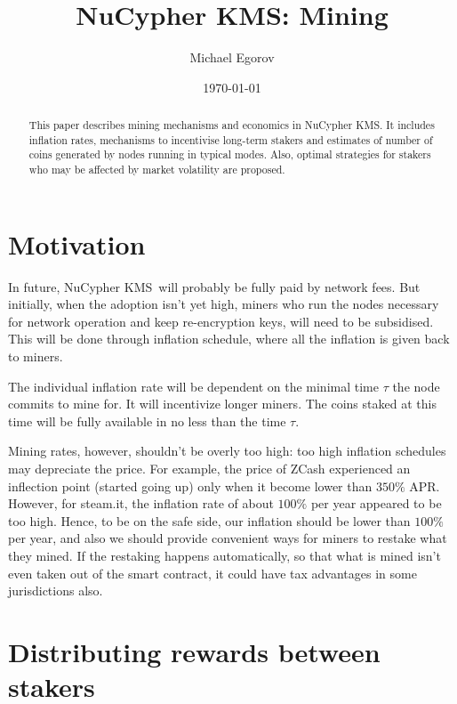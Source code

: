 \documentclass[longbibliography,nofootinbib,twocolumn]{revtex4-1}
\newcommand{\kms}{NuCypher KMS}
\begin{document}
\title{\kms: Mining}

\author{Michael Egorov}

\begin{abstract}
    This paper describes mining mechanisms and economics in \kms.
    It includes inflation rates, mechanisms to incentivise long-term stakers
    and estimates of number of coins generated by nodes running in typical modes.
    Also, optimal strategies for stakers who may be affected by market volatility are proposed.
\end{abstract}

\date{\today}
\maketitle

\section{Motivation}

In future, \kms~will probably be fully paid by network fees.
But initially, when the adoption isn't yet high, miners who run the nodes necessary for network operation and keep re-encryption keys,
will need to be subsidised.
This will be done through inflation schedule, where all the inflation is given back to miners.

The individual inflation rate will be dependent on the minimal time $\tau$ the node commits to mine for.
It will incentivize longer miners.
The coins staked at this time will be fully available in no less than the time $\tau$.

Mining rates, however, shouldn't be overly too high: too high inflation schedules may depreciate the price.
For example, the price of ZCash experienced an inflection point (started going up) only when it become lower than $350\%$ APR.
However, for steam.it, the inflation rate of about $100\%$ per year appeared to be too high.
Hence, to be on the safe side, our inflation should be lower than $100\%$ per year, and also we should provide convenient ways for miners to restake what they
mined.
If the restaking happens automatically, so that what is mined isn't even taken out of the smart contract, it could have tax advantages in some jurisdictions
also.

\section{Distributing rewards between stakers}
\end{document}
